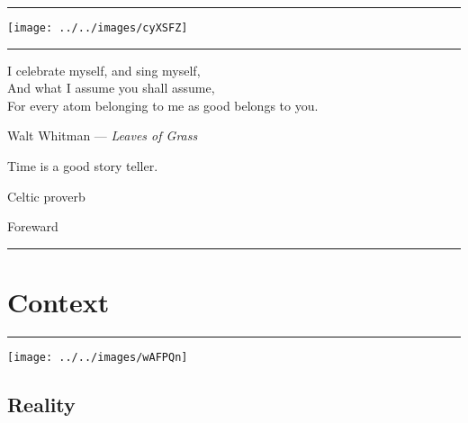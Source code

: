 \documentclass[letterpaper,10.5pt,twoside,onecolumn,openany]{book}
\begin{document}
	\tableofcontents
	
	\newpage
	\thispagestyle{empty}
	\hrule
	
	\vspace{30mm}
	\begin{center}
		\texttt{[image: ../../images/cyXSFZ]}
	\end{center}
	
	
	\newpage
	\thispagestyle{empty}
	\hrule
	
	\vspace{40mm}
	
	\begin{center}
		I celebrate myself, and sing myself,\\
		And what I assume you shall assume,\\
		For every atom belonging to me as good belongs to you.\\
		\vspace{5mm}
		
		Walt Whitman --- \textit{Leaves of Grass}
		
		
	\end{center}
	
	\vspace{5mm}
	\begin{center}
		
		Time is a good story teller.
		
		
		Celtic proverb
		
	\end{center}
	
	\newpage
	\thispagestyle{empty}
	
	\begin{center}
		\huge{Foreward}
	\end{center}
	\hrule



\part{Context}

\thispagestyle{empty}

	\hrule

\vspace{30mm}

\begin{center}
	\texttt{[image: ../../images/wAFPQn]}
\end{center}


\chapter{Reality}

\end{document}

